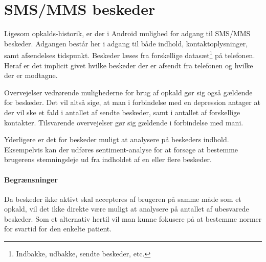 \section{SMS/MMS beskeder}\label{datasamling:smsmms}
Ligesom opkalds-historik, er der i Android mulighed for adgang til SMS/MMS beskeder.
Adgangen består her i adgang til både indhold, kontaktoplysninger, samt afsendelses tidspunkt.
Beskeder læses fra forskellige datasæt\footnote{Indbakke, udbakke, sendte beskeder, etc.} på telefonen.
Heraf er det implicit givet hvilke beskeder der er afsendt fra telefonen og hvilke der er modtagne.

Overvejelser vedrørende mulighederne for brug af opkald gør sig også gældende for beskeder.
Det vil altså sige, at man i forbindelse med en depression antager at der vil ske et fald i antallet af sendte beskeder, samt i antallet af forskellige kontakter.
Tilsvarende overvejelser gør sig gældende i forbindelse med mani.

Yderligere er det for beskeder muligt at analysere på beskeders indhold.
Eksempelvis kan der udføres sentiment-analyse for at forsøge at bestemme brugerens stemningsleje ud fra indholdet af en eller flere beskeder.

\paragraph{Begrænsninger}
Da beskeder ikke aktivt skal accepteres af brugeren på samme måde som et opkald, vil det ikke direkte være muligt at analysere på antallet af ubesvarede beskeder.
Som et alternativ hertil vil man kunne fokusere på at bestemme normer for svartid for den enkelte patient.
